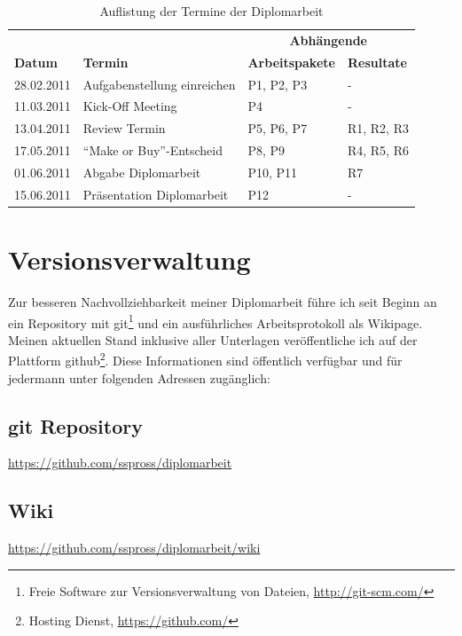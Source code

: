 \begin{table}[htbp]
\begin{center}
    \begin{tabular}{llll}
        \toprule & & \multicolumn{2}{c}{\textbf{Abhängende}} \\
        \textbf{Datum} & \textbf{Termin} & \textbf{Arbeitspakete} & \textbf{Resultate} \\
        \midrule 28.02.2011 & Aufgabenstellung einreichen & P1, P2, P3 & - \\
        \midrule 11.03.2011 & Kick-Off Meeting & P4 & -\\
        \midrule 13.04.2011 & Review Termin & P5, P6, P7 & R1, R2, R3 \\
        \midrule 17.05.2011 & ``Make or Buy''-Entscheid & P8, P9 & R4, R5, R6 \\
        \midrule 01.06.2011 & Abgabe Diplomarbeit & P10, P11 & R7 \\
        \midrule 15.06.2011 & Präsentation Diplomarbeit & P12 & - \\
        \bottomrule
    \end{tabular}
    \caption{Auflistung der Termine der Diplomarbeit}
    \label{tab:termine_diplomarbeit}
\end{center}
\end{table}

\section{Versionsverwaltung}
Zur besseren Nachvollziehbarkeit meiner Diplomarbeit führe ich seit Beginn an
ein Repository mit git\footnote{Freie Software zur Versionsverwaltung von Dateien,
\url{http://git-scm.com/}} und ein ausführliches Arbeitsprotokoll als Wikipage.
Meinen aktuellen Stand inklusive aller Unterlagen veröffentliche ich auf der 
Plattform github\footnote{Hosting Dienst, \url{https://github.com/}}. Diese 
Informationen sind öffentlich verfügbar und für jedermann unter folgenden 
Adressen zugänglich:

\subsection{git Repository}
\url{https://github.com/sspross/diplomarbeit}

\subsection{Wiki}
\url{https://github.com/sspross/diplomarbeit/wiki}

